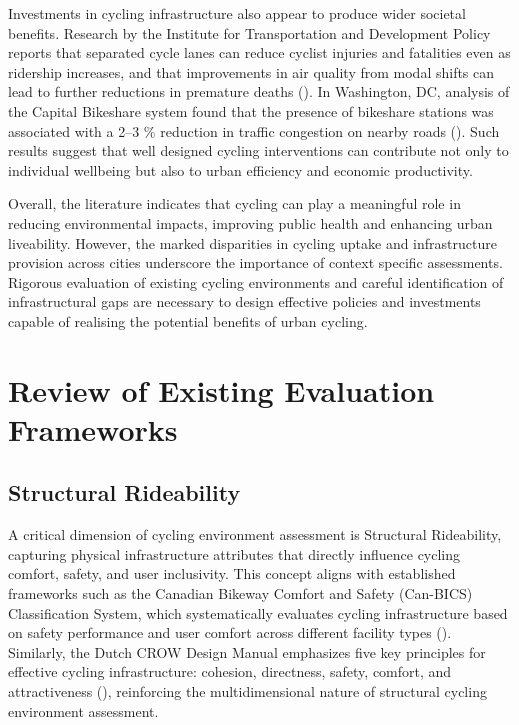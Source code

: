 \documentclass[
  12pt,
  oneside]{book}
\begin{document}
Investments in cycling infrastructure also appear to produce wider societal benefits. Research by the Institute for Transportation and Development Policy reports that separated cycle lanes can reduce cyclist injuries and fatalities even as ridership increases, and that improvements in air quality from modal shifts can lead to further reductions in premature deaths (\textcite{yanocha_economic_2022}). In Washington, DC, analysis of the Capital Bikeshare system found that the presence of bikeshare stations was associated with a 2--3 \% reduction in traffic congestion on nearby roads (\textcite{wichman_commentary_nodate}). Such results suggest that well designed cycling interventions can contribute not only to individual wellbeing but also to urban efficiency and economic productivity.

Overall, the literature indicates that cycling can play a meaningful role in reducing environmental impacts, improving public health and enhancing urban liveability. However, the marked disparities in cycling uptake and infrastructure provision across cities underscore the importance of context specific assessments. Rigorous evaluation of existing cycling environments and careful identification of infrastructural gaps are necessary to design effective policies and investments capable of realising the potential benefits of urban cycling.

\section{Review of Existing Evaluation Frameworks}\label{review-of-existing-evaluation-frameworks}

\subsection{Structural Rideability}\label{structural-rideability}

A critical dimension of cycling environment assessment is Structural Rideability, capturing physical infrastructure attributes that directly influence cycling comfort, safety, and user inclusivity. This concept aligns with established frameworks such as the Canadian Bikeway Comfort and Safety (Can-BICS) Classification System, which systematically evaluates cycling infrastructure based on safety performance and user comfort across different facility types (\textcite{ferster_developing_2023}). Similarly, the Dutch CROW Design Manual emphasizes five key principles for effective cycling infrastructure: cohesion, directness, safety, comfort, and attractiveness (\textcite{crow_design_2016}), reinforcing the multidimensional nature of structural cycling environment assessment.
\end{document}
